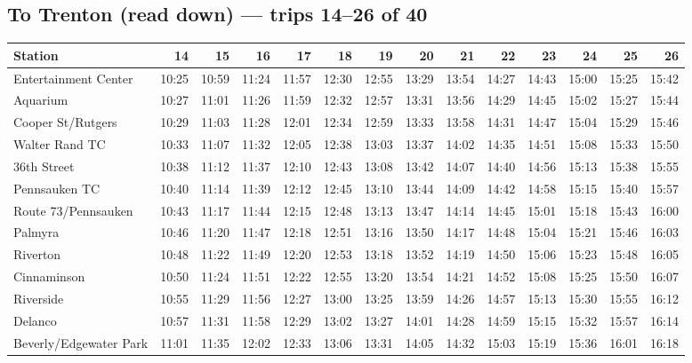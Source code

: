 \subsection*{To Trenton (read down) --- trips 14--26 of 40}
\begin{center}\footnotesize\setlength{\tabcolsep}{3pt}\begin{tabular}{@{}lrrrrrrrrrrrrr@{}}\toprule
Station & 14 & 15 & 16 & 17 & 18 & 19 & 20 & 21 & 22 & 23 & 24 & 25 & 26 \\\midrule
Entertainment Center & 10:25 & 10:59 & 11:24 & 11:57 & 12:30 & 12:55 & 13:29 & 13:54 & 14:27 & 14:43 & 15:00 & 15:25 & 15:42 \\
Aquarium & 10:27 & 11:01 & 11:26 & 11:59 & 12:32 & 12:57 & 13:31 & 13:56 & 14:29 & 14:45 & 15:02 & 15:27 & 15:44 \\
Cooper St/Rutgers & 10:29 & 11:03 & 11:28 & 12:01 & 12:34 & 12:59 & 13:33 & 13:58 & 14:31 & 14:47 & 15:04 & 15:29 & 15:46 \\
Walter Rand TC & 10:33 & 11:07 & 11:32 & 12:05 & 12:38 & 13:03 & 13:37 & 14:02 & 14:35 & 14:51 & 15:08 & 15:33 & 15:50 \\
36th Street & 10:38 & 11:12 & 11:37 & 12:10 & 12:43 & 13:08 & 13:42 & 14:07 & 14:40 & 14:56 & 15:13 & 15:38 & 15:55 \\
Pennsauken TC & 10:40 & 11:14 & 11:39 & 12:12 & 12:45 & 13:10 & 13:44 & 14:09 & 14:42 & 14:58 & 15:15 & 15:40 & 15:57 \\
Route 73/Pennsauken & 10:43 & 11:17 & 11:44 & 12:15 & 12:48 & 13:13 & 13:47 & 14:14 & 14:45 & 15:01 & 15:18 & 15:43 & 16:00 \\
Palmyra & 10:46 & 11:20 & 11:47 & 12:18 & 12:51 & 13:16 & 13:50 & 14:17 & 14:48 & 15:04 & 15:21 & 15:46 & 16:03 \\
Riverton & 10:48 & 11:22 & 11:49 & 12:20 & 12:53 & 13:18 & 13:52 & 14:19 & 14:50 & 15:06 & 15:23 & 15:48 & 16:05 \\
Cinnaminson & 10:50 & 11:24 & 11:51 & 12:22 & 12:55 & 13:20 & 13:54 & 14:21 & 14:52 & 15:08 & 15:25 & 15:50 & 16:07 \\
Riverside & 10:55 & 11:29 & 11:56 & 12:27 & 13:00 & 13:25 & 13:59 & 14:26 & 14:57 & 15:13 & 15:30 & 15:55 & 16:12 \\
Delanco & 10:57 & 11:31 & 11:58 & 12:29 & 13:02 & 13:27 & 14:01 & 14:28 & 14:59 & 15:15 & 15:32 & 15:57 & 16:14 \\
Beverly/Edgewater Park & 11:01 & 11:35 & 12:02 & 12:33 & 13:06 & 13:31 & 14:05 & 14:32 & 15:03 & 15:19 & 15:36 & 16:01 & 16:18 \\

\end{tabular}
\end{center}
